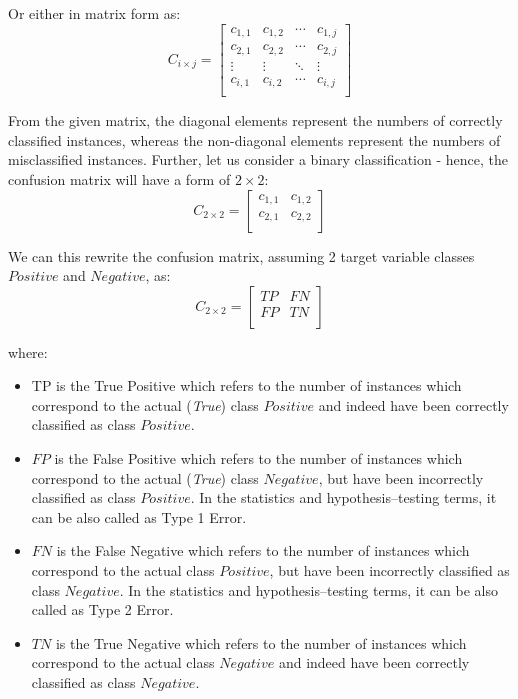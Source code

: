 Or either in matrix form as:
\begin{equation}\label{eq}
    C_{i \times j} = \begin{bmatrix}
    c_{1,1} & c_{1,2} & \cdots & c_{1,j} \\
    c_{2,1} & c_{2,2} & \cdots & c_{2,j} \\
    \vdots & \vdots & \ddots & \vdots \\
    c_{i,1} & c_{i,2} & \cdots & c_{i,j} \\
    \end{bmatrix}
\end{equation}

From the given matrix, the diagonal elements represent the numbers of correctly classified instances, whereas the non-diagonal elements represent the numbers of misclassified instances.
Further, let us consider a binary classification - hence, the confusion matrix will have a form of $2\times 2$:
\begin{equation}
    C_{2 \times 2} = \begin{bmatrix}
    c_{1,1} & c_{1,2} \\
    c_{2,1} & c_{2,2} \\
    \end{bmatrix}
\end{equation}


We can this rewrite the confusion matrix, assuming 2 target variable classes $Positive$ and $Negative$, as:
\begin{equation}
    C_{2 \times 2} = \begin{bmatrix}
    TP & FN \\
    FP & TN \\
    \end{bmatrix}
\end{equation}

where:
\begin{itemize}\setlength\itemsep{0em}
    \item TP is the True Positive which refers to the number of instances which correspond to the actual (\textit{True}) class $Positive$ and indeed have been correctly classified as class $Positive$.
	\item $FP$ is the False Positive which refers to the number of instances which correspond to the actual (\textit{True}) class $Negative$, but have been incorrectly classified as class $Positive$. In the statistics and hypothesis--testing terms, it can be also called as Type 1 Error.
	\item $FN$ is the False Negative which refers to the number of instances which correspond to the actual class $Positive$, but have been incorrectly classified as class $Negative$. In the statistics and hypothesis--testing terms, it can be also called as Type 2 Error.
	\item $TN$ is the True Negative which refers to the number of instances which correspond to the actual class $Negative$ and indeed have been correctly classified as class $Negative$.
\end{itemize}

